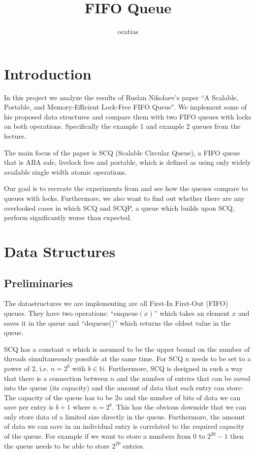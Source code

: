 \documentclass{article}      %
\title{FIFO Queue}
\author{ocatias}
\begin{document}

\maketitle

\section{Introduction}
In this project we analyze the results of Ruslan Nikolaev's paper  ``A Scalable, Portable, and Memory-Efficient Lock-Free FIFO Queue"\cite{nikolaev2019scalable}. We implement some of his proposed data structures and compare them with two FIFO queues with locks on both operations. Specifically the example 1 and example 2 queues from the lecture.

The main focus of the paper is SCQ (Scalable Circular Queue), a FIFO queue that is ABA safe, livelock free and portable, which is defined as using only widely available single width atomic operations. 

Our goal is to recreate the experiments from \cite{nikolaev2019scalable} and see how the queues compare to queues with locks. Furthermore, we also want to find out whether there are any overlooked cases in which SCQ and SCQP, a queue which builds upon SCQ, perform significantly worse than expected. 

\section{Data Structures}

\subsection{Preliminaries}
The datastructures we are implementing are all First-In First-Out (FIFO) queues. They have two operations: ``enqueue$(x)$'' which takes an element $x$ and saves it in the queue and ``dequeue()'' which returns the oldest value in the queue.
 
SCQ has a constant $n$ which is assumed to be the upper bound on the number of threads simultaneously possible at the same time. For SCQ $n$ needs to be set to a power of 2, i.e. $n = 2^b$ with $b\in \mathbb{N}$.   Furthermore, SCQ is designed in such a way that there is a connection between $n$ and the number of entries that can be saved into the queue (its capacity) and the amount of data that each entry can store: The capacity of the queue has to be $2n$ and the number of bits of data we can save per entry is $b+1$ where $n= 2^b$.  This has the obvious downside that we can only store data of a limited size directly in the queue. Furthermore, the amount of data we can save in an individual entry is correlated to the required capacity of the queue. For example if we want to store a numbers from $0$ to $2^{20}-1$ then the queue needs to be able to store $2^{20}$ entries.
\end{document}
